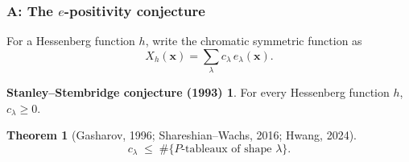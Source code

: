 \documentclass{beamer}
\newtheorem{thm}{Theorem}[section]
\theoremstyle{definition}
\newtheorem*{StanleyStembridge}{Stanley--Stembridge conjecture (1993)}
\newcommand\xx{\mathbf{x}}
\begin{document}

\begin{frame}
  \frametitle{A: The \( e \)-positivity conjecture}
  For a Hessenberg function \( h \), write the chromatic symmetric function as
  \[
    X_h(\xx) = \sum_{\lambda} c_\lambda\, e_\lambda(\xx).
  \]
  \pause
  \begin{StanleyStembridge}
    For every Hessenberg function \( h \), \( c_\lambda \ge 0 \).
  \end{StanleyStembridge}
  \pause

  \begin{thm}[Gasharov, 1996; Shareshian--Wachs, 2016; Hwang, 2024]
    \[
      c_\lambda \;\le\; \#\{P\text{-tableaux of shape } \lambda\}.
    \]
  \end{thm}
\end{frame}

\end{document}
